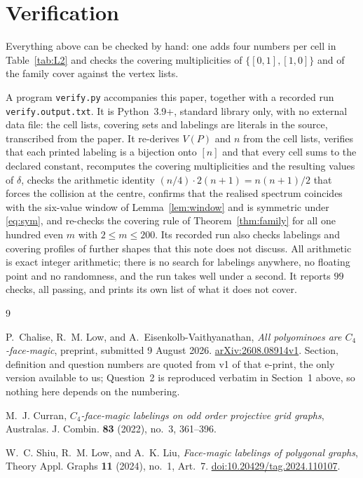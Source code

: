 \documentclass[11pt]{amsart}
\begin{document}
\section{Verification}\label{sec:verify}

Everything above can be checked by hand: one adds four numbers per cell in
Table~\ref{tab:L2} and checks the covering multiplicities of
$\{[0,1],[1,0]\}$ and of the family cover against the vertex lists.

A program \texttt{verify.py} accompanies this paper, together with a recorded
run \texttt{verify.output.txt}. It is Python~3.9+, standard library only, with
no external data file: the cell lists, covering sets and labelings are
literals in the source, transcribed from the paper. It re-derives $V(P)$ and
$n$ from the cell lists, verifies that each printed labeling is a bijection
onto $[n]$ and that every cell sums to the declared constant, recomputes the
covering multiplicities and the resulting values of $\delta$, checks the
arithmetic identity $(n/4)\cdot2(n+1)=n(n+1)/2$ that forces the collision at
the centre, confirms that the realised spectrum coincides with the six-value
window of Lemma~\ref{lem:window} and is symmetric under \eqref{eq:sym}, and
re-checks the covering rule of Theorem~\ref{thm:family} for all one hundred
even $m$ with $2\le m\le200$. Its recorded run also checks labelings and
covering profiles of further shapes that this note does not discuss. All
arithmetic is exact integer arithmetic; there is no search for labelings
anywhere, no floating point and no randomness, and the run takes well under a
second. It reports $99$ checks, all passing, and prints its own list of what
it does not cover.

\begin{thebibliography}{9}

P.~Chalise, R.~M. Low, and A.~Eisenkolb-Vaithyanathan,
\emph{All polyominoes are $C_4$-face-magic},
preprint, submitted 9 August 2026.
\href{https://arxiv.org/abs/2608.08914v1}{arXiv:2608.08914v1}.
Section, definition and question numbers are quoted from v1 of that e-print,
the only version available to us; Question~2 is reproduced verbatim in
Section~1 above, so nothing here depends on the numbering.

M.~J. Curran,
\emph{$C_4$-face-magic labelings on odd order projective grid graphs},
Australas. J. Combin. \textbf{83} (2022), no.~3, 361--396.

W.~C. Shiu, R.~M. Low, and A.~K. Liu,
\emph{Face-magic labelings of polygonal graphs},
Theory Appl. Graphs \textbf{11} (2024), no.~1, Art.~7.
\href{https://doi.org/10.20429/tag.2024.110107}{doi:10.20429/tag.2024.110107}.

\end{thebibliography}
\end{document}
